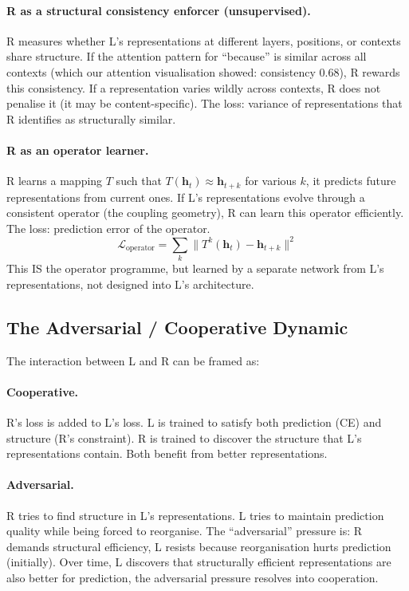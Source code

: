\documentclass[11pt, a4paper]{article}
\newcommand{\h}{\mathbf{h}}
\theoremstyle{plain}
\theoremstyle{definition}
\theoremstyle{remark}
\begin{document}
\paragraph{R as a structural consistency enforcer (unsupervised).}
R measures whether L's representations at different layers, positions, or contexts share structure.
If the attention pattern for ``because'' is similar across all contexts (which our attention visualisation showed: consistency 0.68), R rewards this consistency.
If a representation varies wildly across contexts, R does not penalise it (it may be content-specific).
The loss: variance of representations that R identifies as structurally similar.

\paragraph{R as an operator learner.}
R learns a mapping $T$ such that $T(\h_t) \approx \h_{t+k}$ for various $k$, it predicts future representations from current ones.
If L's representations evolve through a consistent operator (the coupling geometry), R can learn this operator efficiently.
The loss: prediction error of the operator.
\begin{equation}
\mathcal{L}_{\mathrm{operator}} = \sum_k \| T^k(\h_t) - \h_{t+k} \|^2
\end{equation}
This IS the operator programme, but learned by a separate network from L's representations, not designed into L's architecture.

\subsection{The Adversarial / Cooperative Dynamic}

The interaction between L and R can be framed as:

\paragraph{Cooperative.}
R's loss is added to L's loss.
L is trained to satisfy both prediction (CE) and structure (R's constraint).
R is trained to discover the structure that L's representations contain.
Both benefit from better representations.

\paragraph{Adversarial.}
R tries to find structure in L's representations.
L tries to maintain prediction quality while being forced to reorganise.
The ``adversarial'' pressure is: R demands structural efficiency, L resists because reorganisation hurts prediction (initially).
Over time, L discovers that structurally efficient representations are also better for prediction, the adversarial pressure resolves into cooperation.
\end{document}
